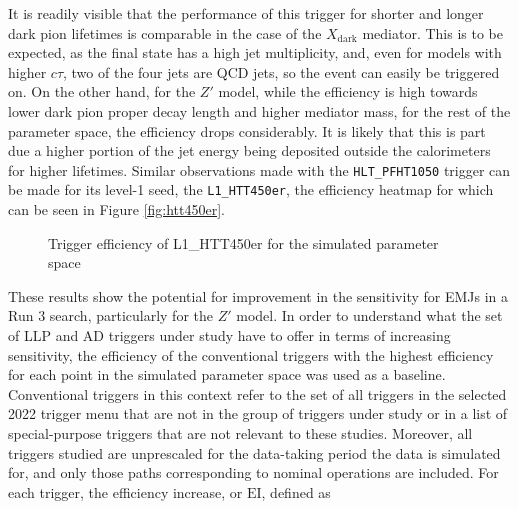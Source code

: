 It is readily visible that the performance of this trigger for shorter and longer dark pion lifetimes is comparable in the case of the $X_{\text{dark}}$ mediator. This is to be expected, as the final state has a high jet multiplicity, and, even for models with higher $c\tau$, two of the four jets are QCD jets, so the event can easily be triggered on. On the other hand, for the $Z'$ model, while the efficiency is high towards lower dark pion proper decay length and higher mediator mass, for the rest of the parameter space, the efficiency drops considerably. It is likely that this is part due a higher portion of the jet energy being deposited outside the calorimeters for higher lifetimes. Similar observations made with the \texttt{HLT\_PFHT1050} trigger can be made for its level-1 seed, the \texttt{L1\_HTT450er}, the efficiency heatmap for which can be seen in Figure \ref{fig:htt450er}.

\begin{figure}[h]
    \centering
    \begin{subfigure}{0.45\textwidth}
        
    \end{subfigure}
    \hfill
    \begin{subfigure}{0.45\textwidth}
        
    \end{subfigure}
    \caption{Trigger efficiency of L1\_HTT450er for the simulated parameter space}
    \label{fig:ht1050}
\end{figure}

These results show the potential for improvement in the sensitivity for EMJs in a Run 3 search, particularly for the $Z'$ model. In order to understand what the set of LLP and AD triggers under study have to offer in terms of increasing sensitivity, the efficiency of the conventional triggers with the highest efficiency for each point in the simulated parameter space was used as a baseline. Conventional triggers in this context refer to the set of all triggers in the selected 2022 trigger menu that are not in the group of triggers under study or in a list of special-purpose triggers that are not relevant to these studies. Moreover, all triggers studied are unprescaled for the data-taking period the data is simulated for, and only those paths corresponding to nominal operations are included. For each trigger, the efficiency increase, or $\text{EI}$, defined as

